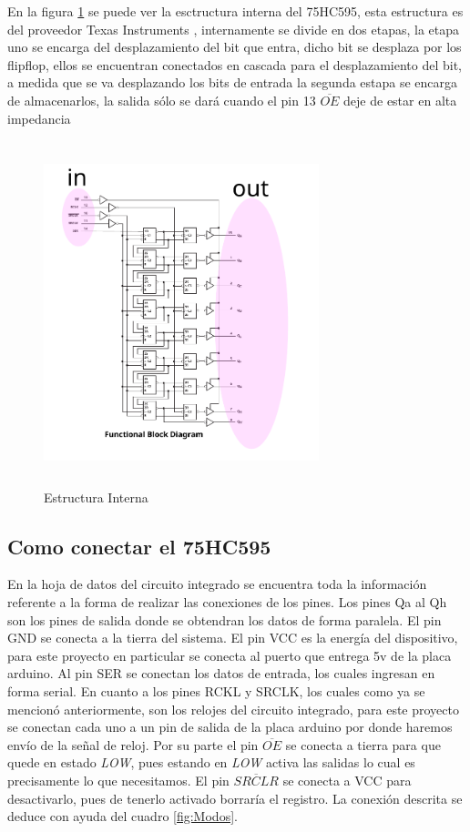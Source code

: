 \documentclass{article}
\begin{document}
En la figura \ref{fig:Estructura Interna} se puede ver la esctructura interna del 75HC595, esta estructura es del proveedor Texas Instruments \cite{Datasheet}, internamente se divide en dos etapas, la etapa uno se encarga del desplazamiento del bit que entra, dicho bit se desplaza por los flipflop, ellos se encuentran conectados en cascada para el desplazamiento del bit, a medida que se va desplazando los bits de entrada la segunda estapa se encarga de almacenarlos, la salida sólo se dará cuando el pin 13 $\overline{OE}$ deje de estar en alta impedancia




\begin{figure}[H]
    \includegraphics[width=8cm,angle=0, height=10cm ]{imagen/estructuraInterna.pdf}
    \centering
    \caption{Estructura Interna}
    \label{fig:Estructura Interna}
    \end{figure}

\subsection{Como conectar el 75HC595}

En la hoja de datos del circuito integrado se encuentra toda la información referente a la forma de realizar las conexiones de los pines.
Los pines Qa al Qh son los pines de salida donde se obtendran los datos de forma paralela. El pin GND se conecta a la tierra del sistema. El pin VCC es la energía del dispositivo, para este proyecto en particular se conecta al puerto que entrega 5v de la placa arduino. Al pin SER se conectan los datos de entrada, los cuales ingresan en forma serial. En cuanto a los pines RCKL y SRCLK, los cuales como ya se mencionó anteriormente, son los relojes del circuito integrado, para este proyecto se conectan cada uno a un pin de salida de la placa arduino por donde haremos envío de la señal de reloj. Por su parte el pin $\overline{OE}$ se conecta a tierra para que quede en estado \textit{LOW}, pues estando en \textit{LOW} activa las salidas lo cual es precisamente lo que necesitamos. El pin $\overline{SRCLR}$ se conecta a VCC para desactivarlo, pues de tenerlo activado borraría el registro. 
La conexión descrita se deduce con ayuda del cuadro \ref{fig:Modos}.
\end{document}
